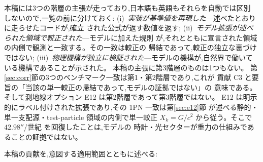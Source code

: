 \documentclass[a4paper,10pt,twocolumn]{ltjsarticle}
\newcommand{\Kt}{X_k}
\begin{document}
本稿には3つの階層の主張が走っており,日本語も英語もそれらを自動では区別
しないので,一覧の前に分けておく:
(i)~\emph{実装が基準値を再現した}---述べたとおりに走らせたコードが,確立
された公式が返す数値を返す;
(ii)~\emph{モデル拡張が述べられた領域で較正された}---モデルに加えた規則
が,それとともに宣言された領域の内側で観測と一致する。その一致は較正の
帰結であって,較正の独立な裏づけではない;
(iii)~\emph{物理機構が独立に検証された}---モデルの機構が,自然界で働いて
いる機構であることが示された。
本稿の主張に第3階層のものは1つもない。
第\ref{sec:corr}節の3つのベンチマーク一致は第1・第2階層であり,これが
貢献 C3 と要旨の「当該の単一較正の帰結であって,モデルの証拠ではない」の
意味である。そして測地線オプション E12 は第2階層であって第3階層ではない。
E12 は明示的にラベル付けされた拡張であり,その 1PN 一致は第\ref{sec:e12}節
が述べる静的・単一支配源・test-particle 領域の内側で単一較正
$\Kt = G/c^2$ から従う。そこで $42.98''$/世紀 を回復したことは,モデルの
時計・光セクターが重力の仕組みであることの証拠ではない。

本稿の貢献を,意図する適用範囲とともに述べる:
\end{document}

